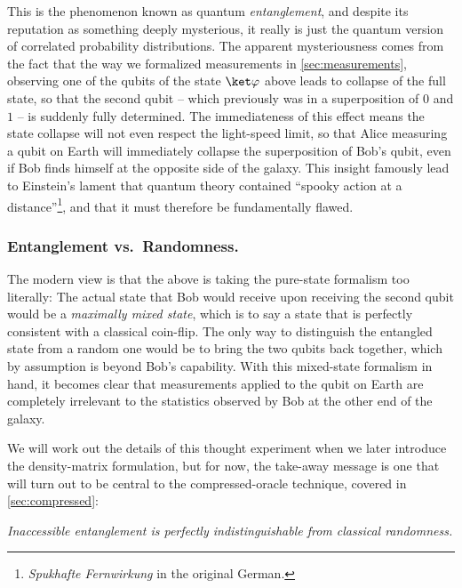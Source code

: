     This is the phenomenon known as quantum \emph{entanglement}, and despite its
      reputation as something deeply mysterious, it really is
      just the quantum version of correlated probability distributions.
      The apparent mysteriousness comes from the fact that the way we 
      formalized measurements in \cref{sec:measurements}, observing one of the
      qubits of the state $\ket\varphi$ above leads to collapse of the full
      state, so that the second qubit -- which previously was in a superposition
      of $0$ and $1$ -- is suddenly fully determined. The immediateness of this
      effect means the state collapse will not even respect the light-speed
      limit, so that Alice measuring a qubit on Earth will immediately collapse the
      superposition of Bob's qubit, even if Bob finds himself at the opposite side of the
      galaxy. This insight famously lead to Einstein's lament that quantum theory
      contained ``spooky action at a distance''\footnote{\emph{Spukhafte
      Fernwirkung} in the original German.}, and that it must therefore be
      fundamentally flawed.

    \subsubsection{Entanglement vs.\ Randomness.}
    The modern view is that the above is taking the pure-state formalism too
      literally: The actual state that Bob would receive upon receiving the
      second qubit would be a \emph{maximally mixed state}, which is to say a
      state that is perfectly consistent with a classical coin-flip.
      The only way to distinguish the entangled state from a random one would be
      to bring the two qubits back together, which by assumption is beyond Bob's
      capability. With this mixed-state formalism in hand, 
      it becomes clear that measurements applied to the qubit on Earth are
      completely irrelevant to the statistics observed by Bob at the other end of the
      galaxy. 

    We will work out the details of this thought experiment when we later
      introduce the density-matrix formulation, but for now, the take-away message
      is one that will turn out to be central to the compressed-oracle
      technique\iffutureversion, covered in \cref{sec:compressed}\fi:
    \begin{center}
      \emph{Inaccessible entanglement is perfectly indistinguishable from classical randomness.}
    \end{center}
